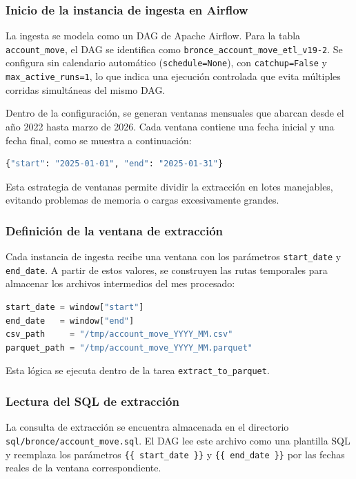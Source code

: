 \subsubsection{Inicio de la instancia de ingesta en Airflow}

La ingesta se modela como un DAG de Apache Airflow. Para la tabla \texttt{account\_move}, el DAG se identifica como \texttt{bronce\_account\_move\_etl\_v19-2}. Se configura sin calendario automático (\texttt{schedule=None}), con \texttt{catchup=False} y \texttt{max\_active\_runs=1}, lo que indica una ejecución controlada que evita múltiples corridas simultáneas del mismo DAG.

Dentro de la configuración, se generan ventanas mensuales que abarcan desde el año 2022 hasta marzo de 2026. Cada ventana contiene una fecha inicial y una fecha final, como se muestra a continuación:

\begin{lstlisting}[language=Python, breaklines=true]
{"start": "2025-01-01", "end": "2025-01-31"}
\end{lstlisting}

Esta estrategia de ventanas permite dividir la extracción en lotes manejables, evitando problemas de memoria o cargas excesivamente grandes.

\subsubsection{Definición de la ventana de extracción}

Cada instancia de ingesta recibe una ventana con los parámetros \texttt{start\_date} y \texttt{end\_date}. A partir de estos valores, se construyen las rutas temporales para almacenar los archivos intermedios del mes procesado:

\begin{lstlisting}[language=Python, breaklines=true]
start_date = window["start"]
end_date   = window["end"]
csv_path     = "/tmp/account_move_YYYY_MM.csv"
parquet_path = "/tmp/account_move_YYYY_MM.parquet"
\end{lstlisting}

Esta lógica se ejecuta dentro de la tarea \texttt{extract\_to\_parquet}.

\subsubsection{Lectura del SQL de extracción}

La consulta de extracción se encuentra almacenada en el directorio \texttt{sql/bronce/account\_move.sql}. El DAG lee este archivo como una plantilla SQL y reemplaza los parámetros \texttt{\{\{ start\_date \}\}} y \texttt{\{\{ end\_date \}\}} por las fechas reales de la ventana correspondiente.

